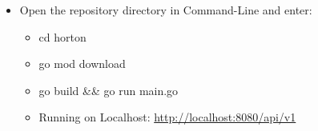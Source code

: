 \begin{itemize}
  \item Open the repository directory in Command-Line and enter:
    \begin{itemize}
    \item cd horton
    \item go mod download
    \item go build \&\& go run main.go
    \end{itemize}
\begin{itemize}
\item Running on Localhost: \url{http://localhost:8080/api/v1}
\end{itemize}
\end{itemize}
